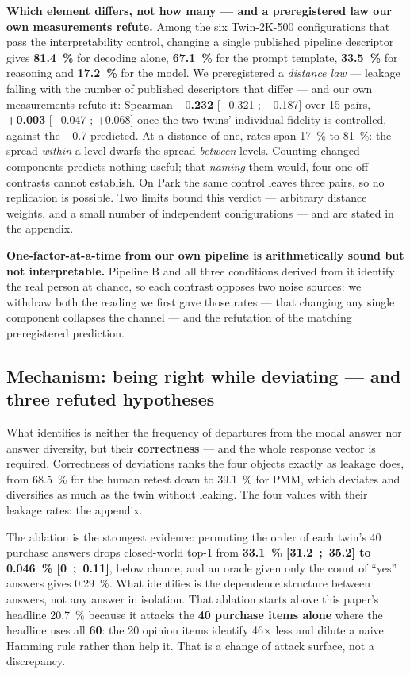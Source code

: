 \documentclass[sigconf,anonymous,review]{acmart}
\begin{document}
\textbf{Which element differs, not how many --- and a preregistered law our own measurements refute.} Among the six Twin-2K-500 configurations that pass the interpretability control, changing a single published pipeline descriptor gives \textbf{81.4~\%} for decoding alone, \textbf{67.1~\%} for the prompt template, \textbf{33.5~\%} for reasoning and \textbf{17.2~\%} for the model. We preregistered a \textit{distance law} --- leakage falling with the number of published descriptors that differ --- and our own measurements refute it: Spearman \textbf{$-0$.232} [$-0$.321 ; $-0$.187] over 15 pairs, \textbf{+0.003} [$-0$.047 ; +0.068] once the two twins' individual fidelity is controlled, against the $-0$.7 predicted. At a distance of one, rates span 17~\% to 81~\%: the spread \textit{within} a level dwarfs the spread \textit{between} levels. Counting changed components predicts nothing useful; that \textit{naming} them would, four one-off contrasts cannot establish. On Park the same control leaves three pairs, so no replication is possible. Two limits bound this verdict --- arbitrary distance weights, and a small number of independent configurations --- and are stated in the appendix.

\textbf{One-factor-at-a-time from our own pipeline is arithmetically sound but not interpretable.} Pipeline B and all three conditions derived from it identify the real person at chance, so each contrast opposes two noise sources: we withdraw both the reading we first gave those rates --- that changing any single component collapses the channel --- and the refutation of the matching preregistered prediction.

\subsection{Mechanism: being right while deviating --- and three refuted hypotheses}

What identifies is neither the frequency of departures from the modal answer nor answer diversity, but their \textbf{correctness} --- and the whole response vector is required. Correctness of deviations ranks the four objects exactly as leakage does, from 68.5~\% for the human retest down to 39.1~\% for PMM, which deviates and diversifies as much as the twin without leaking. The four values with their leakage rates: the appendix.

The ablation is the strongest evidence: permuting the order of each twin's 40 purchase answers drops closed-world top-1 from \textbf{33.1~\% [31.2~;~35.2] to 0.046~\% [0~;~0.11]}, below chance, and an oracle given only the count of ``yes'' answers gives 0.29~\%. What identifies is the dependence structure between answers, not any answer in isolation. That ablation starts above this paper's headline 20.7~\% because it attacks the \textbf{40 purchase items alone} where the headline uses all \textbf{60}: the 20 opinion items identify 46$\times$ less and dilute a naive Hamming rule rather than help it. That is a change of attack surface, not a discrepancy.
\end{document}
